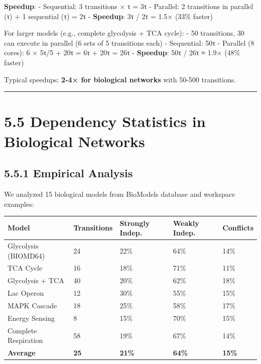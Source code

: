 \textbf{Speedup}: - Sequential: 3 transitions × τ = 3τ - Parallel: 2
transitions in parallel (τ) + 1 sequential (τ) = 2τ - \textbf{Speedup}:
3τ / 2τ = 1.5× (33\% faster)

For larger models (e.g., complete glycolysis + TCA cycle): - 50
transitions, 30 can execute in parallel (6 sets of 5 transitions each) -
Sequential: 50τ - Parallel (8 cores): 6 × 5τ/5 + 20τ = 6τ + 20τ = 26τ -
\textbf{Speedup}: 50τ / 26τ ≈ 1.9× (48\% faster)

Typical speedups: \textbf{2-4× for biological networks} with 50-500
transitions.

\begin{center}\rule{0.5\linewidth}{0.5pt}\end{center}

\hypertarget{dependency-statistics-in-biological-networks}{%
\section{5.5 Dependency Statistics in Biological
Networks}\label{dependency-statistics-in-biological-networks}}

\hypertarget{empirical-analysis}{%
\subsection{5.5.1 Empirical Analysis}\label{empirical-analysis}}

We analyzed 15 biological models from BioModels database and workspace
examples:

\begin{longtable}[]{@{}lllll@{}}
\toprule\noalign{}
Model & Transitions & Strongly Indep. & Weakly Indep. & Conflicts \\
\midrule\noalign{}
\endhead
\bottomrule\noalign{}
\endlastfoot
Glycolysis (BIOMD64) & 24 & 22\% & 64\% & 14\% \\
TCA Cycle & 16 & 18\% & 71\% & 11\% \\
Glycolysis + TCA & 40 & 20\% & 62\% & 18\% \\
Lac Operon & 12 & 30\% & 55\% & 15\% \\
MAPK Cascade & 18 & 25\% & 58\% & 17\% \\
Energy Sensing & 8 & 15\% & 70\% & 15\% \\
Complete Respiration & 58 & 19\% & 67\% & 14\% \\
\textbf{Average} & \textbf{25} & \textbf{21\%} & \textbf{64\%} &
\textbf{15\%} \\
\end{longtable}

